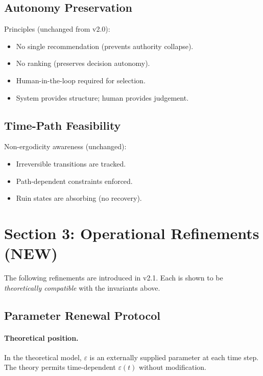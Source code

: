 \subsection{Autonomy Preservation}
\label{sec:inv-autonomy}

Principles (unchanged from v2.0):

\begin{itemize}
\item No single recommendation (prevents authority collapse).
\item No ranking (preserves decision autonomy).
\item Human-in-the-loop required for selection.
\item System provides structure; human provides judgement.
\end{itemize}

\subsection{Time-Path Feasibility}
\label{sec:inv-time-path}

Non-ergodicity awareness (unchanged):

\begin{itemize}
\item Irreversible transitions are tracked.
\item Path-dependent constraints enforced.
\item Ruin states are absorbing (no recovery).
\end{itemize}

\section{Section 3: Operational Refinements (NEW)}
\label{sec:operational-refinements}

The following refinements are introduced in v2.1. Each is shown to be
\emph{theoretically compatible} with the invariants above.

\subsection{Parameter Renewal Protocol}
\label{sec:parameter-renewal}

\paragraph{Theoretical position.}
In the theoretical model, $\varepsilon$ is an externally supplied
parameter at each time step. The theory permits time-dependent
$\varepsilon(t)$ without modification.

